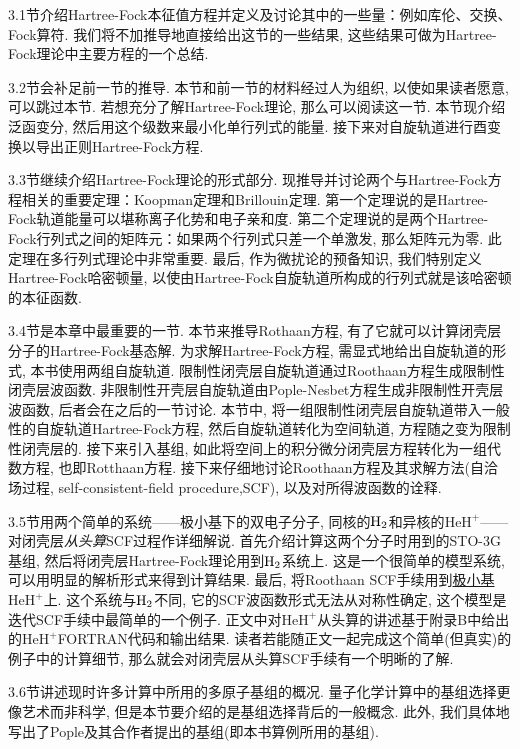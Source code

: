 3.1节介绍Hartree-Fock本征值方程并定义及讨论其中的一些量：例如库伦、交换、Fock算符. 
我们将不加推导地直接给出这节的一些结果, 这些结果可做为Hartree-Fock理论中主要方程的一个总结.

3.2节会补足前一节的推导. 本节和前一节的材料经过人为组织, 以使如果读者愿意, 可以跳过本节. 
若想充分了解Hartree-Fock理论, 那么可以阅读这一节. 本节现介绍泛函变分, 然后用这个级数来最小化单行列式的能量. 
接下来对自旋轨道进行酉变换以导出正则Hartree-Fock方程.

3.3节继续介绍Hartree-Fock理论的形式部分. 
现推导并讨论两个与Hartree-Fock方程相关的重要定理：Koopman定理和Brillouin定理. 
第一个定理说的是Hartree-Fock轨道能量可以堪称离子化势和电子亲和度. 
第二个定理说的是两个Hartree-Fock行列式之间的矩阵元：如果两个行列式只差一个单激发, 那么矩阵元为零. 
此定理在多行列式理论中非常重要. 
最后, 作为微扰论的预备知识, 我们特别定义Hartree-Fock哈密顿量, 以使由Hartree-Fock自旋轨道所构成的行列式就是该哈密顿的本征函数.

3.4节是本章中最重要的一节. 本节来推导Rothaan方程, 有了它就可以计算闭壳层分子的Hartree-Fock基态解. 
为求解Hartree-Fock方程, 需显式地给出自旋轨道的形式, 本书使用两组自旋轨道.
限制性闭壳层自旋轨道通过Roothaan方程生成限制性闭壳层波函数. 
非限制性开壳层自旋轨道由Pople-Nesbet方程生成非限制性开壳层波函数, 后者会在之后的一节讨论. 
本节中, 将一组限制性闭壳层自旋轨道带入一般性的自旋轨道Hartree-Fock方程, 然后自旋轨道转化为空间轨道, 
方程随之变为限制性闭壳层的. 
接下来引入基组, 如此将空间上的积分微分闭壳层\hft 方程转化为一组代数方程, 也即Rotthaan方程.
接下来仔细地讨论Roothaan方程及其求解方法(自洽场过程, self-consistent-field procedure,SCF), 以及对所得波函数的诠释.

3.5节用两个简单的系统——极小基下的双电子分子, 同核的$\mathrm{H}_2$和异核的$\mathrm{HeH}^+$——对闭壳层\emph{从头算}SCF过程作详细解说. 
首先介绍计算这两个分子时用到的STO-3G基组, 然后将闭壳层Hartree-Fock理论用到$\mathrm{H}_2$系统上. 
这是一个很简单的模型系统, 可以用明显的解析形式来得到计算结果. 
最后, 将Roothaan SCF手续用到\underline{极小基$\mathrm{HeH}^+$}上. 
这个系统与$\mathrm{H}_2$不同, 它的SCF波函数形式无法从对称性确定, 这个模型是迭代SCF手续中最简单的一个例子. 
正文中对$\mathrm{HeH}^+$从头算的讲述基于附录B中给出的$\mathrm{HeH}^+$FORTRAN代码和输出结果. 
读者若能随正文一起完成这个简单(但真实)的例子中的计算细节, 那么就会对闭壳层从头算SCF手续有一个明晰的了解.

3.6节讲述现时许多计算中所用的多原子基组的概况. 
量子化学计算中的基组选择更像艺术而非科学, 但是本节要介绍的是基组选择背后的一般概念. 
此外, 我们具体地写出了Pople及其合作者提出的基组(即本书算例所用的基组).  

